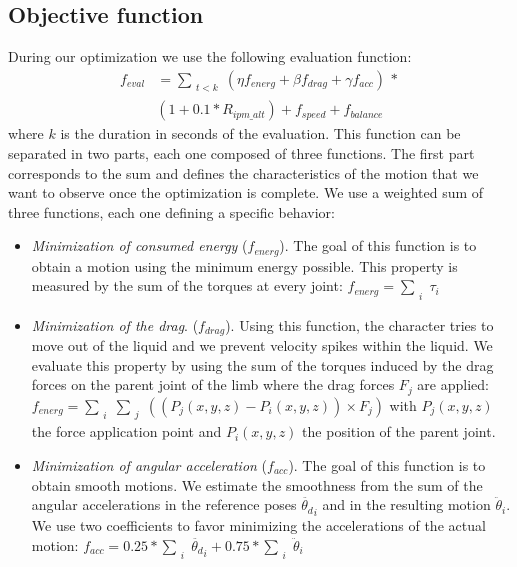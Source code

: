 \documentclass[conference]{acmsiggraph}
\begin{document}
\subsection{Objective function}
During our optimization we use the following evaluation function:
\begin{equation}
\begin{split}
f_{eval} &=\sum_{\substack{t<k}} (\eta f_{energ} + \beta f_{drag} + \gamma f_{acc})\, *\\&(1+0.1* R_{ipm\_alt}) 
+ f_{speed} + f_{balance}
\label{eq:complete_eval}
\end{split}
\end{equation}
where $k$ is the duration in seconds of the evaluation. This function can be separated in two parts, each one composed of three functions. The first part corresponds to the sum and defines the characteristics of the motion that we want to observe once the optimization is complete. We use a weighted sum of three functions, each one defining a specific behavior:
\begin{itemize}
\item{\textit{Minimization of consumed energy} ($f_{energ}$). The goal of this function is to obtain a motion using the minimum energy possible. This property is measured by the sum of the torques at every joint: $f_{energ}=\sum_{\substack{i}}{\tau_i}$} 
\item{\textit{Minimization of the drag}. ($f_{drag}$). Using this function, the character tries to move out of the liquid and we prevent velocity spikes within the liquid. We evaluate this property by using the sum of the torques induced by the drag forces on the parent joint of the limb where the drag forces $F_j$ are applied: $f_{energ}=\sum_{\substack{i}}\sum_{\substack{j}}((P_j(x,y,z)-P_i(x,y,z)) \times F_j)$ with  $P_j(x,y,z)$ the force application point and $P_i(x,y,z)$ the position of the parent joint.}
\item{\textit{Minimization of angular acceleration} ($f_{acc}$). The goal of this function is to obtain smooth motions. We estimate the smoothness from the sum of the angular accelerations in the reference poses $\ddot{\theta_d}_i$ and in the resulting motion $\ddot{\theta}_i$. We use two coefficients to favor minimizing the accelerations of the actual motion: $f_{acc}=0.25*\sum_{\substack{i}}\ddot{\theta_d}_i+0.75*\sum_{\substack{i}}\ddot{\theta}_i$ }
\end{itemize}
\end{document}
